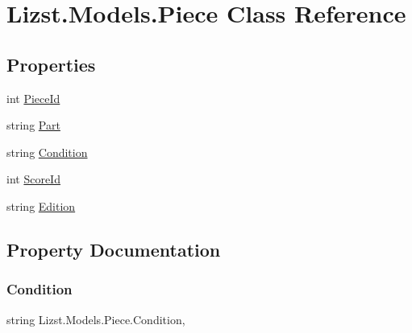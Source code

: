 \hypertarget{class_lizst_1_1_models_1_1_piece}{}\section{Lizst.\+Models.\+Piece Class Reference}
\label{class_lizst_1_1_models_1_1_piece}
\subsection*{Properties}
\begin{DoxyCompactItemize}
\item 
int \mbox{\hyperlink{class_lizst_1_1_models_1_1_piece_aa1d385d50c5b6137ebff8004e2f2167c}{Piece\+Id}}
\item 
string \mbox{\hyperlink{class_lizst_1_1_models_1_1_piece_aad50ad7422ed464d4372195a476cf823}{Part}}
\item 
string \mbox{\hyperlink{class_lizst_1_1_models_1_1_piece_ab161bcdfe0fcff13a6fe87d1b27955d8}{Condition}}
\item 
int \mbox{\hyperlink{class_lizst_1_1_models_1_1_piece_a5d366319d7c89dbe703231c1cdaf5377}{Score\+Id}}
\item 
string \mbox{\hyperlink{class_lizst_1_1_models_1_1_piece_a597472ef7833e2e2ab93f475d807bde4}{Edition}}
\end{DoxyCompactItemize}


\subsection{Property Documentation}
\mbox{\label{class_lizst_1_1_models_1_1_piece_ab161bcdfe0fcff13a6fe87d1b27955d8}} 
\subsubsection{\texorpdfstring{Condition}{Condition}}
{\footnotesize\ttfamily string Lizst.\+Models.\+Piece.\+Condition\hspace{0.3cm}{\ttfamily [get]}, {\ttfamily [set]}}

